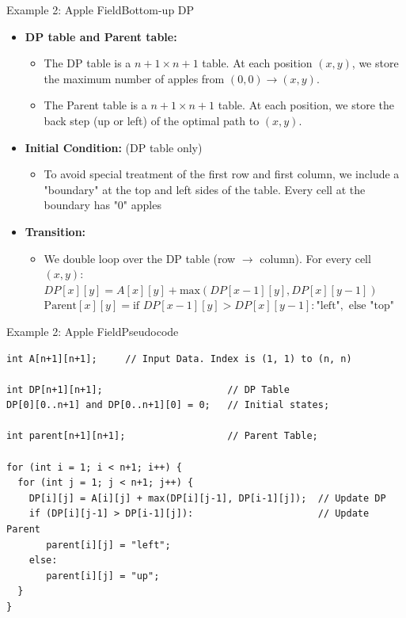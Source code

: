 \begin{frame}{Example 2: Apple Field}{Bottom-up DP}
  \begin{itemize}
  \item {\bf DP table and Parent table:}
  \begin{itemize}
    \item The DP table is a $n+1\times n+1$ table. At each position $(x,y)$, we store the maximum number of apples from $(0,0)\to(x,y)$.
    \item The Parent table is a $n+1\times n+1$ table. At each position, we store the back step (up or left) of the optimal path to $(x,y)$.
  \end{itemize}

  \item {\bf Initial Condition:} (DP table only)
  \begin{itemize}
    \item To avoid special treatment of the first row and first column, we include a "boundary" at the top and left sides of the table. Every cell at the boundary has "0" apples
  \end{itemize}

  \item {\bf Transition:}
  \begin{itemize}
    \item We double loop over the DP table (row $\to$ column). For every cell $(x,y)$:\\
    $DP[x][y] = A[x][y] + \text{max}(DP[x-1][y],DP[x][y-1])$\\
    $\text{Parent}[x][y] = \text{if } DP[x-1][y] > DP[x][y-1]: \text{"left"}, \text{ else }\text{"top"}$
  \end{itemize}
  \end{itemize}
\end{frame}

\begin{frame}[fragile]{Example 2: Apple Field}{Pseudocode}
  {\smaller
  \begin{block}{}
\begin{verbatim}
int A[n+1][n+1];     // Input Data. Index is (1, 1) to (n, n)

int DP[n+1][n+1];                      // DP Table
DP[0][0..n+1] and DP[0..n+1][0] = 0;   // Initial states;

int parent[n+1][n+1];                  // Parent Table;

for (int i = 1; i < n+1; i++) {
  for (int j = 1; j < n+1; j++) {
    DP[i][j] = A[i][j] + max(DP[i][j-1], DP[i-1][j]);  // Update DP
    if (DP[i][j-1] > DP[i-1][j]):                      // Update Parent
       parent[i][j] = "left";
    else:
       parent[i][j] = "up";
  }
}
\end{verbatim}
\end{block}
  }
\end{frame}



